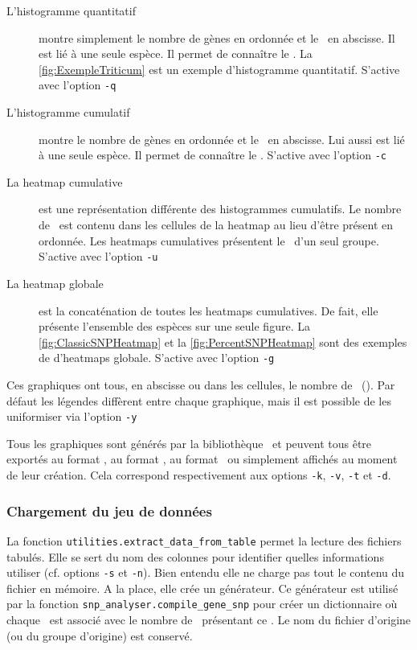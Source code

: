 \documentclass[../main]{subfiles} %
\begin{document}
\begin{description}
\item[L'histogramme quantitatif] montre simplement le nombre de gènes en ordonnée et le \NbSNP en abscisse.  Il est lié à une seule espèce. Il permet de connaître le  \GNSPeq. La \cref{fig:ExempleTriticum} est un exemple d'histogramme quantitatif. S'active avec l'option  \lstinline{-q}

\item[L'histogramme cumulatif] montre le nombre de gènes en ordonnée et le \NbSNP en abscisse. Lui aussi est lié à une seule espèce. Il permet de connaître le \GNSPge. 
S'active avec l'option  \lstinline{-c}
\item[La heatmap cumulative] est une représentation différente des histogrammes cumulatifs. Le nombre de \contigs est contenu dans les cellules de la heatmap au lieu d’être présent en ordonnée. Les heatmaps cumulatives présentent le \GNSPge d’un seul groupe. S'active avec l'option  \lstinline{-u}

\item [La heatmap globale] est la concaténation de toutes les heatmaps cumulatives. De fait, elle présente l’ensemble des espèces sur une seule figure. La \cref{fig:ClassicSNPHeatmap} et la \cref{fig:PercentSNPHeatmap} sont des exemples de  d'heatmaps globale. S'active avec l'option  \lstinline{-g}

\end{description}

Ces graphiques ont tous, en abscisse ou dans les cellules, le nombre de \SNP (\NbSNP). Par défaut les légendes diffèrent entre chaque graphique, mais il est possible de les uniformiser via l’option \lstinline{-y}

Tous les graphiques sont générés par la bibliothèque \MatPlotLib et peuvent tous être exportés au format \png, au format 
\svg, au format \tsv ou simplement affichés au moment de leur création. Cela correspond respectivement aux options \lstinline{-k}, \lstinline{-v}, \lstinline{-t} et \lstinline{-d}. 

\subsubsection{Chargement du jeu de données}
La fonction \lstinline{utilities.extract_data_from_table} permet la lecture des fichiers tabulés. Elle se sert du nom des colonnes pour identifier quelles informations utiliser (cf. options \lstinline{-s} et \lstinline{-n}). Bien entendu elle ne charge pas tout le contenu du fichier en mémoire. A la place, elle crée un générateur. Ce générateur est utilisé par la fonction \lstinline{snp_analyser.compile_gene_snp} pour créer un dictionnaire où chaque \NbSNP est associé avec le nombre de \contigs présentant ce \NbSNP. Le nom du fichier d’origine (ou du groupe d’origine) est conservé. 
\end{document}
